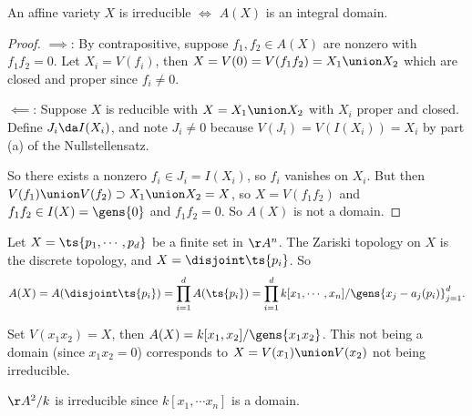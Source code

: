 \begin{proposition}[?]

An affine variety \(X\) is irreducible \(\iff\) \(A(X)\) is an integral
domain.

\end{proposition}

\begin{proof}

\(\implies\): By contrapositive, suppose \(f_1, f_2 \in A(X)\) are
nonzero with \(f_1 f_2 = 0\). Let \(X_i = V(f_i)\), then
\(X= V(0) = V(f_1 f_2) = X_1 \union X_2\) which are closed and proper
since \(f_i \neq 0\).

\hfill\break

\(\impliedby\): Suppose \(X\) is reducible with \(X = X_1 \union X_2\)
with \(X_i\) proper and closed. Define \(J_i \da I(X_i)\), and note
\(J_i \neq 0\) because \(V(J_i) = V(I(X_i)) = X_i\) by part (a) of the
Nullstellensatz.

So there exists a nonzero \(f_i \in J_i = I(X_i)\), so \(f_i\) vanishes
on \(X_i\). But then
\(V(f_1) \union V(f_2) \supset X_1 \union X_2 = X\), so
\(X= V(f_1 f_2)\) and \(f_1 f_2 \in I(X) = \gens{0}\) and
\(f_1 f_2 = 0\). So \(A(X)\) is not a domain.

\end{proof}

\begin{example}

Let \(X = \ts{p_1, \cdots, p_d}\) be a finite set in \(\AA^n\). The
Zariski topology on \(X\) is the discrete topology, and
\(X = \disjoint \ts{p_i}\). So
\begin{align*}  
A(X) = A(\disjoint \ts{p_i}) = \prod_{i=1}^d A({\ts{p_i}}) = \prod_{i=1}^d k[x_1, \cdots, x_n] / \gens{x_j - a_j(p_i)}_{j=1}^d
.\end{align*}

\end{example}

\begin{example}

Set \(V(x_1 x_2) = X\), then \(A(X) = k[x_1, x_2]/ \gens{x_1 x_2}\).
This not being a domain (since \(x_1 x_2 = 0\)) corresponds to
\(X = V(x_1) \union V(x_2)\) not being irreducible.

\end{example}

\begin{example}

\(\AA^2/k\) is irreducible since \(k[x_1, \cdots x_n]\) is a domain.

\end{example}

